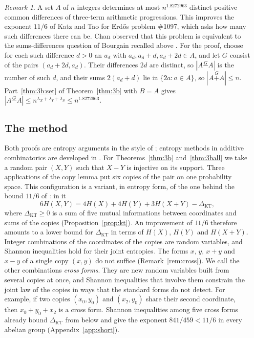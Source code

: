\documentclass[11pt]{amsart}
\theoremstyle{definition}
\theoremstyle{remark}
\newtheorem{remark}[theorem]{Remark}
\numberwithin{equation}{section}
\newcommand{\gp}{\mathbin{\overset{G}{+}}}
\newcommand{\gm}{\mathbin{\overset{G}{-}}}
\newcommand{\KT}{\mathrm{KT}}
\newcommand{\CbUp}{1.8272963}
\newcommand{\CrSlash}{841/459}
\begin{document}
\begin{remark}\label{rem:erdos}
A set $A$ of $n$ integers determines at most $n^{\CbUp}$ distinct positive common differences of three-term arithmetic progressions. This improves the exponent $11/6$ of Katz and Tao \cite{KT99} for Erd\H{o}s problem \#1097, which asks how many such differences there can be. Chan observed that this problem is equivalent to the sums-differences question of Bourgain recalled above \cite{EP1097}. For the proof, choose for each such difference $d>0$ an $a_d$ with $a_d,a_d+d,a_d+2d\in A$, and let $G$ consist of the pairs $(a_d+2d,a_d)$. Their differences $2d$ are distinct, so $|A\gm A|$ is the number of such $d$, and their sums $2(a_d+d)$ lie in $\{2a:a\in A\}$, so $|A\gp A|\le n$. Part~\ref{thm:3b:set} of Theorem~\ref{thm:3b} with $B=A$ gives $|A\gm A|\le n^{\lambda_X+\lambda_Y+\lambda_S}\le n^{\CbUp}$.
\end{remark}


\subsection*{The method}
Both proofs are entropy arguments in the style of \cite{Kle26}; entropy methods in additive combinatorics are developed in \cite{Ru09,Tao10}. For Theorems~\ref{thm:3b} and~\ref{thm:3ball} we take a random pair $(X,Y)$ such that $X-Y$ is injective on its support. Three applications of the copy lemma put six copies of the pair on one probability space. This configuration is a variant, in entropy form, of the one behind the bound $11/6$ of \cite{KT99}: in it
\[
6H(X,Y)=4H(X)+4H(Y)+3H(X+Y)-\Delta_\KT,
\]
where $\Delta_\KT\ge0$ is a sum of five mutual informations between coordinates and sums of the copies (Proposition~\ref{prop:kt}). An improvement of $11/6$ therefore amounts to a lower bound for $\Delta_\KT$ in terms of $H(X)$, $H(Y)$ and $H(X+Y)$. Integer combinations of the coordinates of the copies are random variables, and Shannon inequalities hold for their joint entropies. The forms $x$, $y$, $x+y$ and $x-y$ of a single copy $(x,y)$ do not suffice (Remark~\ref{rem:cross}). We call the other combinations \emph{cross forms}. They are new random variables built from several copies at once, and Shannon inequalities that involve them constrain the joint law of the copies in ways that the standard forms do not detect. For example, if two copies $(x_0,y_0)$ and $(x_2,y_0)$ share their second coordinate, then $x_0+y_0+x_2$ is a cross form. Shannon inequalities among five cross forms already bound $\Delta_\KT$ from below and give the exponent $\CrSlash<11/6$ in every abelian group (Appendix~\ref{app:short}).
\end{document}
